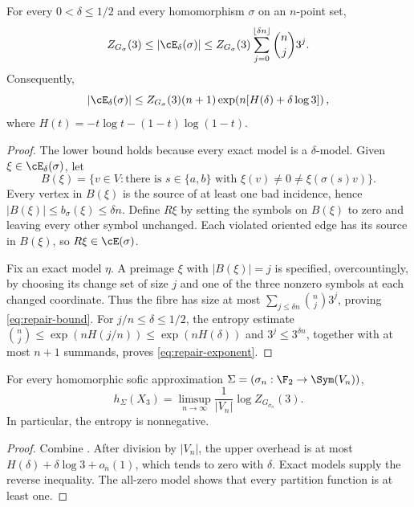\begin{proposition}\label{prop:repair}
For every $0<\delta\le1/2$ and every homomorphism $\sigma$ on an $n$-point
set,
\begin{equation}\label{eq:repair-bound}
 Z_{G_\sigma}(3)
 \le |\cE_\delta(\sigma)|
 \le Z_{G_\sigma}(3)
 \sum_{j=0}^{\lfloor\delta n\rfloor}\binom nj3^j.
\end{equation}
Consequently,
\begin{equation}\label{eq:repair-exponent}
 |\cE_\delta(\sigma)|
 \le Z_{G_\sigma}(3)(n+1)
 \exp\!\left(n[H(\delta)+\delta\log3]\right),
\end{equation}
where $H(t)=-t\log t-(1-t)\log(1-t)$.
\end{proposition}

\begin{proof}
The lower bound holds because every exact model is a $\delta$-model.  Given
$\xi\in\cE_\delta(\sigma)$, let
\[
 B(\xi)=\{v\in V:\text{there is }s\in\{a,b\}
 \text{ with }\xi(v)\ne0\ne\xi(\sigma(s)v)\}.
\]
Every vertex in $B(\xi)$ is the source of at least one bad incidence, hence
$|B(\xi)|\le b_\sigma(\xi)\le\delta n$.  Define $R\xi$ by setting the symbols
on $B(\xi)$ to zero and leaving every other symbol unchanged.  Each violated
oriented edge has its source in $B(\xi)$, so $R\xi\in\cE(\sigma)$.

Fix an exact model $\eta$.  A preimage $\xi$ with $|B(\xi)|=j$ is specified,
overcountingly, by choosing its change set of size $j$ and one of the three
nonzero symbols at each changed coordinate.  Thus the fibre has size at most
$\sum_{j\le\delta n}\binom nj3^j$, proving \eqref{eq:repair-bound}.  For
$j/n\le\delta\le1/2$, the entropy estimate
$\binom nj\le\exp(nH(j/n))\le\exp(nH(\delta))$ and $3^j\le3^{\delta n}$,
together with at most $n+1$ summands, proves
\eqref{eq:repair-exponent}.
\end{proof}

\begin{corollary}\label{cor:model-formula}
For every homomorphic sofic approximation
$\Sigma=(\sigma_n:\F_2\to\Sym(V_n))$,
\begin{equation}\label{eq:model-formula}
 h_\Sigma(X_3)=\limsup_{n\to\infty}\frac1{|V_n|}
 \log Z_{G_{\sigma_n}}(3).
\end{equation}
In particular, the entropy is nonnegative.
\end{corollary}

\begin{proof}
Combine .  After division by $|V_n|$, the
upper overhead is at most
$H(\delta)+\delta\log3+o_n(1)$, which tends to zero with $\delta$.  Exact
models supply the reverse inequality.  The all-zero model shows that every
partition function is at least one.
\end{proof}

